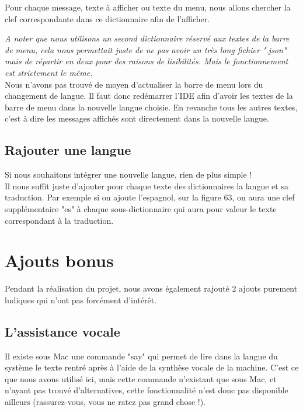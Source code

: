 \documentclass[a4paper,12pt]{article}
\begin{document}
	Pour chaque message, texte à afficher ou texte du menu, nous allons chercher la clef correspondante dans ce dictionnaire afin de l'afficher. 
	
	\textit{A noter que nous utilisons un second dictionnaire réservé aux textes de la barre de menu, cela nous permettait juste de ne pas avoir un très long fichier ".json" mais de répartir en deux pour des raisons de lisibilités. Mais le fonctionnement est strictement le même.}\\
	
	Nous n'avons pas trouvé de moyen d'actualiser la barre de menu lors du changement de langue. Il faut donc redémarrer l'IDE afin d'avoir les textes de la barre de menu dans la nouvelle langue choisie. En revanche tous les autres textes, c'est à dire les messages affichés sont directement dans la nouvelle langue.
	
	\subsection{Rajouter une langue}

	Si nous souhaitons intégrer une nouvelle langue, rien de plus simple !\\
	
	Il nous suffit juste d'ajouter pour chaque texte des dictionnaires la langue et sa traduction. Par exemple si on ajoute l'espagnol, sur la figure 63, on aura une clef supplémentaire "es" à chaque sous-dictionnaire qui aura pour valeur le texte correspondant à la traduction.

\section{Ajouts bonus}

	Pendant la réalisation du projet, nous avons également rajouté 2 ajouts purement ludiques qui n'ont pas forcément d'intérêt. 
	
	\subsection{L'assistance vocale}
	
		Il existe sous Mac une commande "say" qui permet de lire dans la langue du système le texte rentré après à l'aide de la synthèse vocale de la machine. C'est ce que nous avons utilisé ici, mais cette commande n'existant que sous Mac, et n'ayant pas trouvé d'alternatives, cette fonctionnalité n'est donc pas disponible ailleurs (rassurez-vous, vous ne ratez pas grand chose !).\\
		
\end{document}
